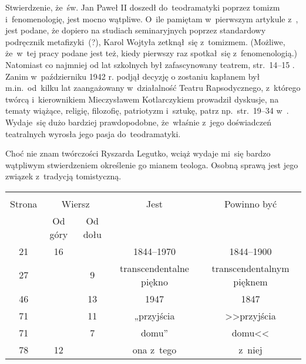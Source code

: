 \documentclass[a4paper,11pt]{article}
\begin{document}
\vspace{\spaceTwo}













\start {} Stwierdzenie, że~św. Jan Paweł II doszedł
do~teodramatyki poprzez tomizm i~fenomenologię, jest mocno wątpliwe.
O~ile pamiętam w~pierwszym artykule z~\cite{PoslugaMysleniaTomIX2011},
jest podane, że dopiero na studiach seminaryjnych poprzez standardowy
podręcznik metafizyki~(?), Karol Wojtyła zetknął~się z~tomizmem.
(Możliwe, że~w~tej pracy podane jest też, kiedy pierwszy raz
spotkał~się z~fenomenologią.) Natomiast co najmniej od lat szkolnych
był zafascynowany teatrem, str.~14--15
\cite{NowakJanPawelIIKronikaZyciaIPontyfikatu2015}. Zanim
w~październiku 1942 r. podjął decyzję o zostaniu kapłanem był
m.in.~od~kilku lat zaangażowany w~działalność Teatru Rapsodycznego,
z~którego twórcą i~kierownikiem Mieczysławem Kotlarczykiem prowadził
dyskusje, na tematy wiążące, religię, filozofię, patriotyzm i~sztukę,
patrz np.~str.~19--34
w~\cite{NowakJanPawelIIKronikaZyciaIPontyfikatu2015}. Wydaje~się dużo
bardziej prawdopodobne, że~właśnie z~jego doświadczeń teatralnych
wyrosła jego pasja do~teodramatyki.

\vspace{\spaceFour}


\start {} Choć nie znam twórczości Ryszarda Legutko, wciąż
wydaje mi~się bardzo wątpliwym stwierdzeniem określenie go mianem
teologa. Osobną sprawą jest jego związek z~tradycją tomistyczną.






\begin{center}

  \begin{tabular}{|c|c|c|c|c|}
    \hline
    & \multicolumn{2}{c|}{} & & \\
    Strona & \multicolumn{2}{c|}{Wiersz} & Jest
                              & Powinno być \\ \cline{2-3}
    & Od góry & Od dołu & & \\
    \hline
    21  & 16 & & 1844--1970 & 1844--1900 \\
    27  & &  9 & transcendentalne piękno & transcendentalnym pięknem \\
    46  & & 13 & 1947 & 1847 \\
    71  & & 11 & „przyjścia & >>przyjścia \\
    71  & &  7 & domu” & domu<< \\
    78  & 12 & & ona z~tego & z~niej \\
    \hline
  \end{tabular}

\end{center}
\end{document}
